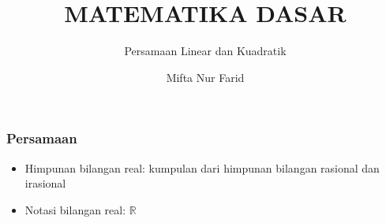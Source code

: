 \documentclass[pdflatex,compress,mathserif]{beamer}
\title{MATEMATIKA DASAR}
\subtitle{Persamaan Linear dan Kuadratik}
\author{Mifta Nur Farid}
\begin{document}
\maketitle

\begin{frame}
\frametitle{Persamaan}
	\begin{itemize}
		\item Himpunan bilangan real: kumpulan dari himpunan bilangan rasional dan irasional
		\item Notasi bilangan real: $\mathbb{R}$
	\end{itemize}
\end{frame}
\end{document}
